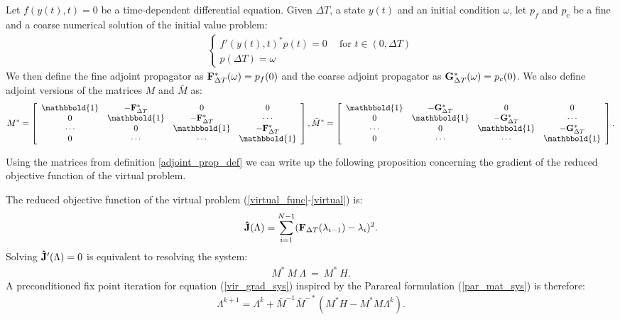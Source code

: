 \begin{definition} \label{adjoint_prop_def}
Let $f(y(t),t)=0$ be a time-dependent differential equation. Given $\Delta T$, a state $y(t)$ and an initial condition $\omega$, let $p_f$ and $p_c$ be a fine and a coarse numerical solution of the initial value problem:
\begin{align}
 \left\{
     \begin{array}{lr}
		f'(y(t),t)^*p(t)=0 \ \quad \textrm{for $t \in (0,\Delta T)$} \\
		p(\Delta T)=\omega
	\end{array}
	\right.	
\end{align}
We then define the fine adjoint propagator as $\bold F_{\Delta T}^*(\omega) = p_f(0)$ and the coarse adjoint propagator as $\bold G_{\Delta T}^*(\omega) = p_c(0)$. We also define adjoint versions of the matrices $M$ and $\bar M$ as: 
\begin{align*}
M^*= \left[ \begin{array}{cccc}
   \mathbbold{1} & -\bold{F}_{\Delta T}^* & 0 & 0 \\  
   0 & \mathbbold{1} & -\bold{F}_{\Delta T}^* & \cdots \\ 
   \cdots &0 &  \mathbbold{1} & -\bold{F}_{\Delta T}^* \\
   0 &\cdots &\cdots &  \mathbbold{1}  \\
   \end{array}  \right],
\bar M^*= \left[ \begin{array}{cccc}
   \mathbbold{1} & -\bold{G}_{\Delta T}^* & 0 & 0 \\  
   0 & \mathbbold{1} & -\bold{G}_{\Delta T}^* & \cdots \\ 
   \cdots &0 &  \mathbbold{1} & -\bold{G}_{\Delta T}^* \\
   0 &\cdots &\cdots &  \mathbbold{1}  \\
   \end{array}  \right].
\end{align*}
\end{definition} 
\noindent
Using the matrices from definition \ref{adjoint_prop_def} we can write up the following proposition concerning the gradient of the reduced objective function of the virtual problem.
\begin{proposition} \label{vir_grad_prop}
The reduced objective function of the virtual problem (\ref{virtual_func}-\ref{virtual}) is:
\begin{align}
\bold{\hat J}(\Lambda) = \sum_{i=1}^{N-1} (\bold F_{\Delta T}(\lambda_{i-1})-\lambda_{i})^2.\label{reduced_viritual}
\end{align}
Solving $\bold{\hat J}'(\Lambda)=0$ is equivalent to resolving the system:
\begin{align}
M^* \ M \ \Lambda \ = \ M^* \ H. \label{vir_grad_sys}
\end{align}
A preconditioned fix point iteration for equation (\ref{vir_grad_sys}) inspired by the Parareal formulation (\ref{par_mat_sys}) is therefore:
\begin{align}
\Lambda^{k+1} = \Lambda^k + \bar{M}^{-1}\bar M^{-*}(M^*H-M^*M\Lambda^k). \label{grad_fix_iter}
\end{align}
\end{proposition}
